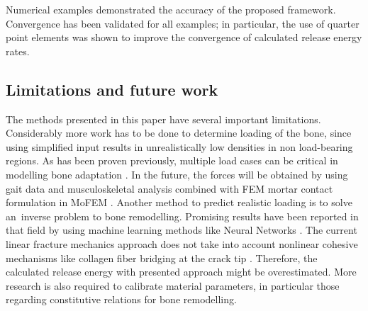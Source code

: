 \documentclass[11pt]{ACMEarticle}
\numberwithin{equation}{section}
\begin{document}
Numerical examples demonstrated the accuracy of the proposed framework. Convergence has been validated for all examples; in particular, the use of quarter point elements was shown to improve the convergence of calculated release energy rates. 
\subsection{Limitations and future work}
The methods presented in this paper have several important limitations. Considerably more work has to be done to determine loading of the bone, since using simplified input results in unrealistically low densities in non load-bearing regions. As has been proven previously, multiple load cases can be critical in modelling bone adaptation \citep{geraldes2016consideration}. In the future, the forces will be obtained by using gait data and musculoskeletal analysis \citep{Delp2007} combined with FEM mortar contact formulation in MoFEM \citep{athanasiadis2018mortar}. Another method to predict realistic loading is to solve an~inverse problem to bone remodelling. Promising results have been reported in that field by using machine learning methods like Neural Networks \citep{campoli2012computational}. The current linear fracture mechanics approach does not take into account nonlinear cohesive mechanisms like collagen fiber bridging at the crack tip \citep{yang2006fracture}. Therefore, the calculated release energy with presented approach might be overestimated. More research is also required to calibrate material parameters, in particular those regarding constitutive relations for bone remodelling. 





\end{document}
